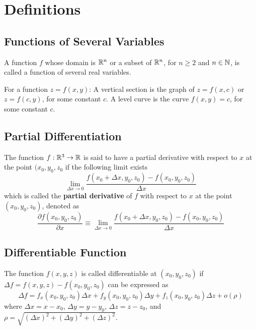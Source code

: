 \chapter*{Definitions}
\theoremstyle{definition}

\section{Functions of Several Variables}
\begin{mydef}
\normalfont A function \(f\) whose domain is \(\mathbb{R}^n\) or a subset of \(\mathbb{R}^n\), for \(n \ge 2\) and \(n \in \mathbb{N}\), is called a function of several real variables.
\end{mydef}


\begin{mydef}
\normalfont For a function \(z = f(x, y)\): A vertical section is the graph of \(z = f(x, c)\) or \(z = f(c, y)\), for some constant \(c\). A level curve is the curve \(f(x, y) = c\), for some constant \(c\).
\end{mydef}


\section{Partial Differentiation}
\begin{mydef}
\normalfont The function \(f : \mathbb{R}^3 \to \mathbb{R}\) is said to have a partial derivative with respect to \(x\) at the point \((x_0, y_0, z_0\) if the following limit exists
%
\[\lim_{\Delta x \to 0}{\frac{f(x_0 + \Delta x, y_0, z_0) - f(x_0, y_0, z_0)}{\Delta x}}\]
%
which is called the \textbf{partial derivative} of \(f\) with respect to \(x\) at the point \((x_0, y_0, z_0)\), denoted as
%
\[\frac{\partial f(x_0, y_0, z_0)}{\partial x} \equiv \lim_{\Delta x \to 0}{\frac{f(x_0 + \Delta x, y_0, z_0) - f(x_0, y_0, z_0)}{\Delta x}}\]
\end{mydef}

\section{Differentiable Function}
\begin{mydef}
\normalfont The function \(f(x, y, z)\) is called differentiable at \((x_0, y_0, z_0)\) if \(\Delta f = f(x, y, z) - f(x_0, y_0, z_0)\) can be expressed as
%
\[\Delta f = f_x(x_0,y_0,z_0)\Delta x + f_y(x_0,y_0,z_0)\Delta y + f_z(x_0,y_0,z_0)\Delta z + o(\rho)\]
%
where \(\Delta x = x - x_0\), \(\Delta y = y - y_0\), \(\Delta z = z - z_0\), and \(\rho = \sqrt{(\Delta x)^2 + (\Delta y)^2 + (\Delta z)^2}\).
\end{mydef}


